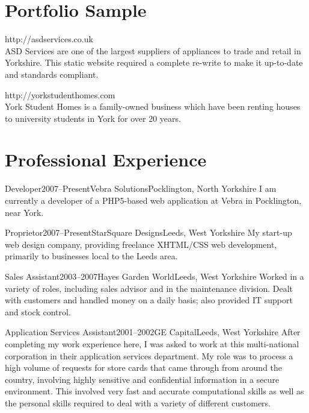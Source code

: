\documentclass{cv}
\begin{document}
\section{Portfolio Sample}

\begin{description}[style=nextline]
\item[ASD Services] http://asdservices.co.uk\\
ASD Services are one of the largest suppliers of appliances to trade and retail in Yorkshire. This static website required a complete re-write to make it up-to-date and standards compliant.
\item[York Student Homes] http://yorkstudenthomes.com\\
York Student Homes is a family-owned business which have been renting houses to university students in York for over 20 years.
\end{description}

\section{Professional Experience}

\begin{experience}{Developer}{2007--Present}{Vebra Solutions}{Pocklington, North Yorkshire}
I am currently a developer of a PHP5-based web application at Vebra in Pocklington, near York.
\end{experience}

\begin{experience}{Proprietor}{2007--Present}{StarSquare Designs}{Leeds, West Yorkshire}
My start-up web design company, providing freelance XHTML/CSS web development, primarily to businesses local to the Leeds area.
\end{experience}

\begin{experience}{Sales Assistant}{2003--2007}{Hayes Garden World}{Leeds, West Yorkshire}
Worked in a variety of roles, including sales advisor and in the maintenance division. Dealt with customers and handled money on a daily basis; also provided IT support and stock control.
\end{experience}

\begin{experience}{Application Services Assistant}{2001--2002}{GE Capital}{Leeds, West Yorkshire}
After completing my work experience here, I was asked to work at this multi-national corporation in their application services department. My role was to process a high volume of requests for store cards that came through from around the country, involving highly sensitive and confidential information in a secure environment. This involved very fast and accurate computational skills as well as the personal skills required to deal with a variety of different customers.
\end{experience}
\end{document}
